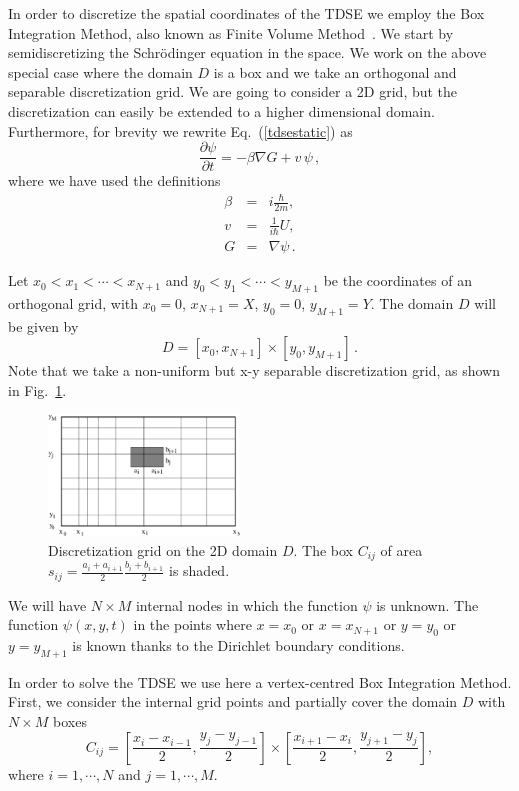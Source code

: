 \documentclass[a4paper,11pt]{article}
\begin{document}
In order to discretize the spatial coordinates of the TDSE we employ
the Box Integration Method, also known as Finite Volume Method~\cite{eymardBOOK}.
We start by semidiscretizing the Schr\"{o}dinger equation in the space.
We work on the above special case where the domain $D$ is a box and we take
an orthogonal and separable discretization grid.
We are going to consider a 2D grid, but the discretization can easily be
extended to a higher dimensional domain.
Furthermore, for brevity we rewrite Eq.~(\ref{tdsestatic}) as
\begin{equation} \label{tdsenoconst}
\frac{\partial \psi}{\partial t} = -\beta \nabla G + v \, \psi \, ,
\end{equation}
where we have used the definitions
\begin{eqnarray}
\beta &=& i \frac{\hbar}{2m} , \\
v &=& \frac{1}{i \hbar} U , \\
G &=& \nabla \psi \, .
\end{eqnarray}

Let $ x_0 < x_1 < \cdots < x_{N+1} $ and $ y_0 < y_1 < \cdots < y_{M+1} $ be the coordinates of an
orthogonal grid, with $x_0=0$, $x_{N+1}=X$, $y_0=0$, $y_{M+1}=Y$.
The domain $D$ will be given by
\begin{equation}
D = [x_0, x_{N+1}] \times [y_0, y_{M+1}] \, .
\end{equation}
Note that we take a non-uniform but x-y separable discretization grid, as shown in Fig.~\ref{fig:bimgrid}. 

\begin{figure}
\centerline{\includegraphics[width=2in] {bmgrid.eps} }
\caption{Discretization grid on the 2D domain $D$.  The box $C_{ij}$ of area
$s_{ij}=\frac{a_i+a_{i+1}}{2} \frac{b_i+b_{i+1}}{2}$ is shaded.}
\label{fig:bimgrid}
\end{figure}

We will have $N \times M$ internal nodes in which the function $\psi$ is unknown.
The function $\psi(x, y, t)$ in the points where $x = x_0$ or $x = x_{N+1}$ or $y = y_0$ or $y = y_{M+1}$
is known thanks to the Dirichlet boundary conditions.

In order to solve the TDSE we use here a vertex-centred Box Integration Method.
First, we consider the internal grid points and partially cover the domain $D$
with $N \times M$ boxes 
\begin{equation}
C_{ij} = [\frac{x_i - x_{i-1}}{2}, \frac{y_j - y_{j-1}}{2}] \times
                [\frac{x_{i+1} - x_i}{2}, \frac{y_{j+1} - y_j}{2}] ,
\end{equation}
where $i = 1, \cdots, N$ and $j = 1, \cdots, M$.
\end{document}

